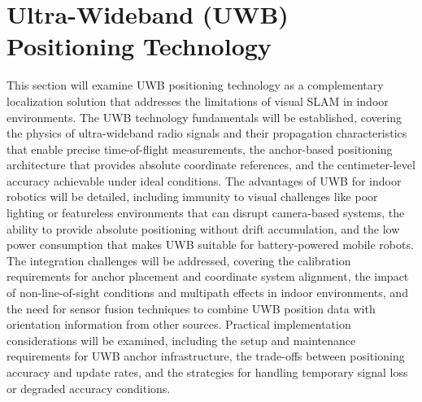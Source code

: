 \section{Ultra-Wideband (UWB) Positioning Technology}
This section will examine UWB positioning technology as a complementary localization solution that addresses the limitations of visual SLAM in indoor environments. The UWB technology fundamentals will be established, covering the physics of ultra-wideband radio signals and their propagation characteristics that enable precise time-of-flight measurements, the anchor-based positioning architecture that provides absolute coordinate references, and the centimeter-level accuracy achievable under ideal conditions. The advantages of UWB for indoor robotics will be detailed, including immunity to visual challenges like poor lighting or featureless environments that can disrupt camera-based systems, the ability to provide absolute positioning without drift accumulation, and the low power consumption that makes UWB suitable for battery-powered mobile robots. The integration challenges will be addressed, covering the calibration requirements for anchor placement and coordinate system alignment, the impact of non-line-of-sight conditions and multipath effects in indoor environments, and the need for sensor fusion techniques to combine UWB position data with orientation information from other sources. Practical implementation considerations will be examined, including the setup and maintenance requirements for UWB anchor infrastructure, the trade-offs between positioning accuracy and update rates, and the strategies for handling temporary signal loss or degraded accuracy conditions.

